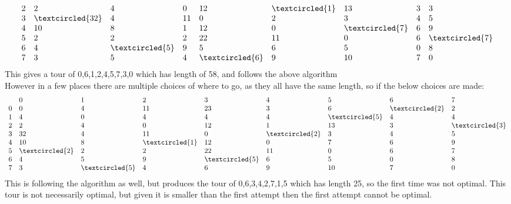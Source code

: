 \documentclass{exam}
\begin{document}
\begin{questions}
\begin{solution}[2in]
$$\begin{array} { l l l l l l l l l } { }
	  { 2 } & { 2 } & { 4 } & { 0 } & { 12 } & { \textcircled{1} } & { 13 } & { 3 } & { 3 } \\
	   { 3 } & { \textcircled{32} } & { 4 } & { 11 } & { 0 } & { 2 } & { 3 } & { 4 } & { 5 } \\
	    { 4 } & { 10 } & { 8 } & { 1 } & { 12 } & { 0 } & { \textcircled{7} } & { 6 } & { 9 } \\
	     { 5 } & { 2 } & { 2 } & { 2 } & { 22 } & { 11 } & { 0 } & { 6 } & { \textcircled{7 }} \\ 
	     { 6 } & { 4 } & { \textcircled{5} } & { 9 } & { 5 } & { 6 } & { 5 } & { 0 } & { 8 } \\
	      { 7 } & { 3 } & { 5 } & { 4 } & { \textcircled{6} } & { 9 } & { 10 } & { 7 } & { 0 }
	       \end{array}$$
This gives a tour of 0,6,1,2,4,5,7,3,0 which has length of 58, and follows the above algorithm\\
However in a few places there are multiple choices of where to go, as they all have the same length, so if the below choices are made:
$$\begin{array} { l l l l l l l l l } 
{ } & { 0 } & { 1 } & { 2 } & { 3 } & { 4 } & { 5 } & { 6 } & { 7 } \\
{ 0 } & { 0 } & { 4 } & { 11 } & { 23 } & { 3 } & { 6 } & { \textcircled{2} } & { 2 } \\ 
{ 1 } & { 4 } & { 0 } & { 4 } & { 4 } & { 4 } & { \textcircled{5} } & { 4 } & { 4 } \\ 
{ 2 } & { 2 } & { 4 } & { 0 } & { 12 } & { 1 } & { 13 } & { 3 } & { \textcircled{3} } \\
 { 3 } & { 32 } & { 4 } & { 11 } & { 0 } & { \textcircled{2} } & { 3 } & { 4 } & { 5 } \\
  { 4 } & { 10 } & { 8 } & { \textcircled{1} } & { 12 } & { 0 } & { 7 } & { 6 } & { 9 } \\
   { 5 } & { \textcircled{2} } & { 2 } & { 2 } & { 22 } & { 11 } & { 0 } & { 6 } & { 7 } \\
    { 6 } & { 4 } & { 5 } & { 9 } & { \textcircled{5} } & { 6 } & { 5 } & { 0 } & { 8 } \\
     { 7 } & { 3 } & { \textcircled{5} } & { 4 } & { 6 } & { 9 } & { 10 } & { 7 } & { 0 }
      \end{array}$$
This is following the algorithm as well, but produces the tour of 0,6,3,4,2,7,1,5 which has length 25, so the first time was not optimal. This tour is not necessarily optimal, but given it is smaller than the first attempt then the first attempt cannot be optimal. 
   
\end{solution}




\end{questions}

		
	
	
	
\end{document}
